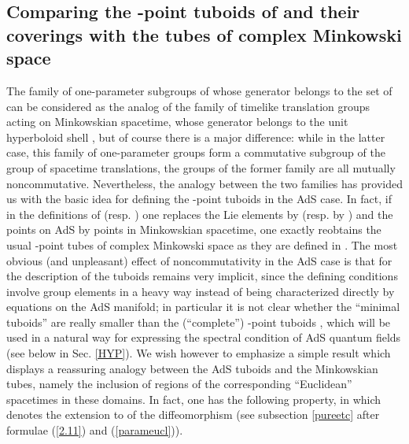 \documentclass[a4paper,a4paper]{article}
\def\CC{{\cal C}}
\def\TT{{\cal T}}
\def\ZZ{{\cal Z}}
\def\wt{\widetilde}
\begin{document}
\subsection{Comparing the \coordHE{}-point tuboids of \coordHE{}
and their coverings with the tubes of complex Minkowski space}
\label{Comptub}
The family of one-parameter subgroups \coordHE{} of \myHighlight{$\wt G_0$}\coordHE{}
whose generator \coordHE{} belongs to the set \myHighlight{$\CC_1$}\coordHE{} of \coordHE{}
can be considered as the analog of the family of timelike
translation groups \coordHE{} acting on Minkowskian spacetime,
whose generator \coordHE{} belongs to the unit hyperboloid shell
\coordHE{}, but of course there is a major difference:
while in the latter case, this family of one-parameter groups form
a commutative subgroup \coordHE{} of the group of spacetime translations,
the groups of the former family are all mutually noncommutative.
Nevertheless, the analogy between the two families has provided us
with the basic idea for defining the \coordHE{}-point tuboids in the AdS case.
In fact, if in the definitions of \myHighlight{$\ZZ_{n+}$}\coordHE{} (resp. \myHighlight{$\TT_{n+}$}\coordHE{})
one replaces the Lie elements \myHighlight{$M_j \in \CC_1$}\coordHE{} by \coordHE{} (resp.
\coordHE{} by \coordHE{}) and the points \coordHE{} on AdS by
points in Minkowskian spacetime, one exactly reobtains the usual
\coordHE{}-point tubes of complex Minkowski space as they are defined in
\cite{SW}. The most obvious (and unpleasant) effect of noncommutativity
in the AdS case is that for \coordHE{} the description of the
tuboids remains very implicit, since  the defining conditions
involve group elements in a heavy way
instead of being characterized directly by equations on the
AdS manifold; in particular it is not clear whether the ``minimal
tuboids'' \myHighlight{$\ZZ_{n+}$}\coordHE{} are really smaller than the (``complete'')
\coordHE{}-point tuboids \myHighlight{$\TT_{n+}$}\coordHE{}, which will be used
in a natural way for expressing
the spectral condition of AdS quantum fields
(see below in Sec. \ref{HYP}).
We wish however to emphasize a simple result which displays
a reassuring analogy between the AdS tuboids and the Minkowskian
tubes, namely the inclusion of regions of the
corresponding ``Euclidean'' spacetimes in these domains. In
fact, one has
the following property, in which \myHighlight{$\wt \chi^{(c)}$}\coordHE{}
denotes the extension to \coordHE{} of
the diffeomorphism \myHighlight{$\wt \chi$}\coordHE{} (see subsection \ref{pureetc}
after formulae (\ref{2.11}) and (\ref{parameucl})).
\end{document}
